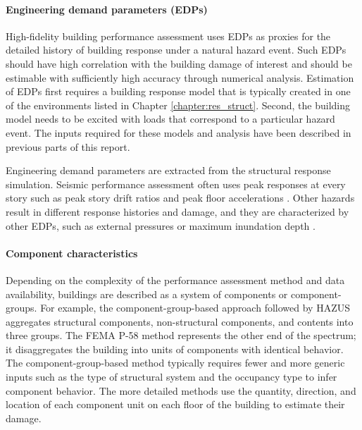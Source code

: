 \paragraph{Engineering demand parameters (EDPs)} High-fidelity building performance assessment uses EDPs as proxies for the detailed history of building response under a natural hazard event. Such EDPs should have high correlation with the building damage of interest and should be estimable with sufficiently high accuracy through numerical analysis. Estimation of EDPs first requires a building response model that is typically created in one of the environments listed in Chapter \ref{chapter:res_struct}. Second, the building model needs to be excited with loads that correspond to a particular hazard event. The inputs required for these models and analysis have been described in previous parts of this report.

Engineering demand parameters are extracted from the structural response simulation. Seismic performance assessment often uses peak responses at every story such as peak story drift ratios and peak floor accelerations \citep{atc2018p-58-1}. Other hazards result in different response histories and damage, and they are characterized by other EDPs, such as external pressures \citep{ouyang2020performance} or maximum inundation depth \citep{reese2011empirical}. 

\paragraph{Component characteristics} Depending on the complexity of the performance assessment method and data availability, buildings are described as a system of components or component-groups. For example, the component-group-based approach followed by HAZUS \citep{fema2011earthquaketechnical} aggregates structural components, non-structural components, and contents into three groups. The FEMA P-58 method represents the other end of the spectrum; it disaggregates the building into units of components with identical behavior. The component-group-based method typically requires fewer and more generic inputs such as the type of structural system and the occupancy type to infer component behavior. The more detailed methods use the quantity, direction, and location of each component unit on each floor of the building to estimate their damage.

